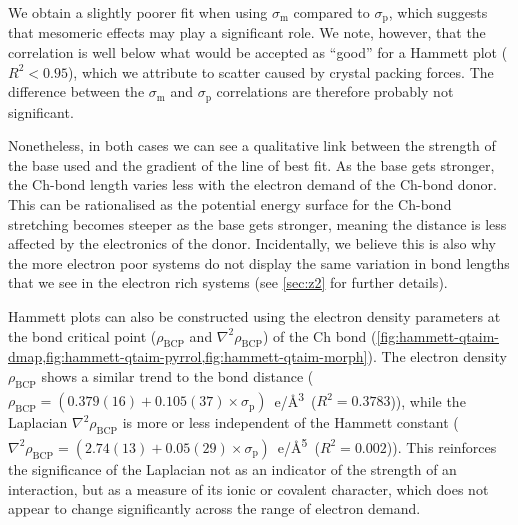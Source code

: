 \begin{refsection}
We obtain a slightly poorer fit when using $\sigma_\text{m}$ compared to $\sigma_\text{p}$, which suggests that mesomeric effects may play a significant role.
We note, however, that the correlation is well below what would be accepted as ``good'' for a Hammett plot ($R^2 < 0.95$)\autocite{Jaffe1953}, which we attribute to scatter caused by crystal packing forces.
The difference between the $\sigma_\text{m}$ and $\sigma_\text{p}$ correlations are therefore probably not significant.

Nonetheless, in both cases we can see a qualitative link between the strength of the base used and the gradient of the line of best fit.
As the base gets stronger, the Ch-bond length varies less with the electron demand of the Ch-bond donor.
This can be rationalised as the potential energy surface for the Ch-bond stretching becomes steeper as the base gets stronger, meaning the distance is less affected by the electronics of the donor.
Incidentally, we believe this is also why the more electron poor systems do not display the same variation in bond lengths that we see in the electron rich systems (see \cref{sec:z2} for further details).

Hammett plots can also be constructed using the electron density parameters at the bond critical point ($\rho_\text{BCP}$ and $\nabla^2\rho_{\text{BCP}}$) of the Ch bond (\cref{fig:hammett-qtaim-dmap,fig:hammett-qtaim-pyrrol,fig:hammett-qtaim-morph}).
The electron density $\rho_\text{BCP}$ shows a similar trend to the bond distance ($\rho_{\text{BCP}} = (0.379(16) + 0.105(37) \times \sigma_\text{p})$~e/\AA\textsuperscript{3}~($R^2=0.3783$)), while the Laplacian $\nabla^2\rho_{\text{BCP}}$ is more or less independent of the Hammett constant ($\nabla^2\rho_{\text{BCP}} = (2.74(13) + 0.05(29) \times \sigma_\text{p})$~e/\AA\textsuperscript{5}~($R^2=0.002$)).
This reinforces the significance of the Laplacian not as an indicator of the strength of an interaction, but as a measure of its ionic or covalent character, which does not appear to change significantly across the range of electron demand.


\end{refsection}
